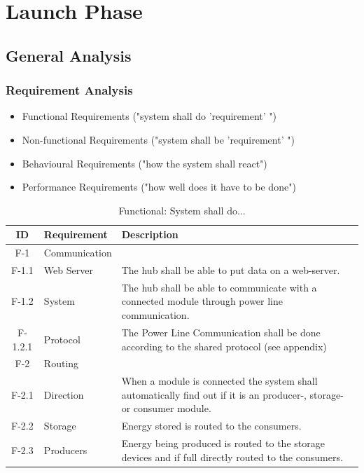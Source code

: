 \chapter{Launch Phase}
\section{General Analysis}
	\subsection{Requirement Analysis}
		\begin{itemize}
			\item Functional Requirements ("system shall do 'requirement' ")
			\item Non-functional Requirements ("system shall be 'requirement' ")
			\item Behavioural Requirements ("how the system shall react")
			\item Performance Requirements ("how well does it have to be done")
		\end{itemize}
		\begin{table}[H]
		\begin{tabular} [b] {| c |  p{3cm} | p{10cm} |}
			\hline
			\textbf{ID} & \textbf{Requirement} & \textbf{Description} \\\hline
			F-1 & Communication 	&  \\ \hline
			F-1.1 & Web Server 		& The hub shall be able to put data on a web-server. \\ \hline
			F-1.2 & System 		& The hub shall be able to communicate with a connected module through power line communication. \\ \hline
			F-1.2.1 & Protocol 		& The Power Line Communication shall be done according to the shared protocol (see appendix)\\ \hline
			F-2 & Routing 			&  \\ \hline
			F-2.1 & Direction		& When a module is connected the system shall automatically find out if it is an producer-, storage- or consumer module.\\ \hline
			F-2.2 & Storage 		& Energy stored is routed to the consumers. \\ \hline
			F-2.3 & Producers 		& Energy being produced is routed to the storage devices and if full directly routed to the consumers. \\ \hline
		\end{tabular}
		\caption{Functional: System shall do...}
		\end{table}
